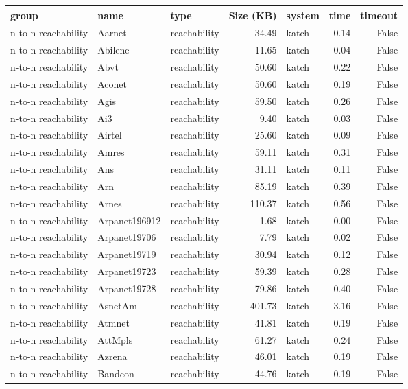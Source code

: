 \begin{tabular}{lllrlrr}
\toprule
group & name & type & Size (KB) & system & time & timeout \\
\midrule
n-to-n reachability & Aarnet & reachability & 34.49 & katch & 0.14 & False \\
n-to-n reachability & Abilene & reachability & 11.65 & katch & 0.04 & False \\
n-to-n reachability & Abvt & reachability & 50.60 & katch & 0.22 & False \\
n-to-n reachability & Aconet & reachability & 50.60 & katch & 0.19 & False \\
n-to-n reachability & Agis & reachability & 59.50 & katch & 0.26 & False \\
n-to-n reachability & Ai3 & reachability & 9.40 & katch & 0.03 & False \\
n-to-n reachability & Airtel & reachability & 25.60 & katch & 0.09 & False \\
n-to-n reachability & Amres & reachability & 59.11 & katch & 0.31 & False \\
n-to-n reachability & Ans & reachability & 31.11 & katch & 0.11 & False \\
n-to-n reachability & Arn & reachability & 85.19 & katch & 0.39 & False \\
n-to-n reachability & Arnes & reachability & 110.37 & katch & 0.56 & False \\
n-to-n reachability & Arpanet196912 & reachability & 1.68 & katch & 0.00 & False \\
n-to-n reachability & Arpanet19706 & reachability & 7.79 & katch & 0.02 & False \\
n-to-n reachability & Arpanet19719 & reachability & 30.94 & katch & 0.12 & False \\
n-to-n reachability & Arpanet19723 & reachability & 59.39 & katch & 0.28 & False \\
n-to-n reachability & Arpanet19728 & reachability & 79.86 & katch & 0.40 & False \\
n-to-n reachability & AsnetAm & reachability & 401.73 & katch & 3.16 & False \\
n-to-n reachability & Atmnet & reachability & 41.81 & katch & 0.19 & False \\
n-to-n reachability & AttMpls & reachability & 61.27 & katch & 0.24 & False \\
n-to-n reachability & Azrena & reachability & 46.01 & katch & 0.19 & False \\
n-to-n reachability & Bandcon & reachability & 44.76 & katch & 0.19 & False \\

\end{tabular}
